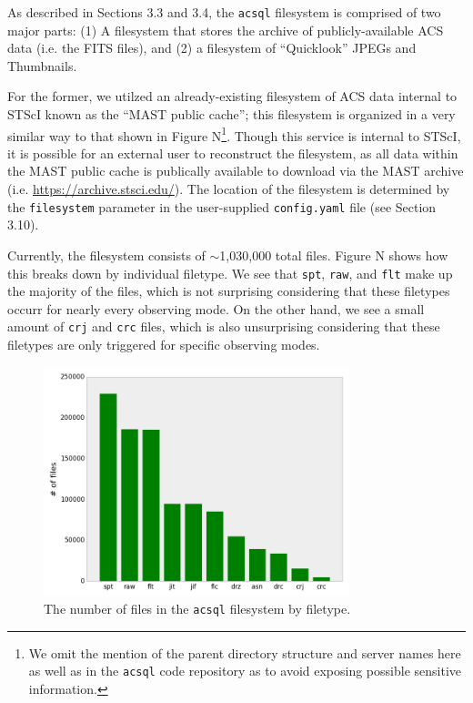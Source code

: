 \documentclass[10pt,journal,compsoc]{IEEEtran}
\begin{document}
As described in Sections 3.3 and 3.4, the \texttt{acsql} filesystem is comprised of two major parts: (1) A filesystem
that stores the archive of publicly-available ACS data (i.e. the FITS files), and (2) a filesystem of ``Quicklook''
JPEGs and Thumbnails.

For the former, we utilzed an already-existing filesystem of ACS data internal to STScI known as the ``MAST public cache'';
this filesystem is organized in a very similar way to that shown in Figure N\footnote{We omit the mention of the parent
directory structure and server names here as well as in the \texttt{acsql} code repository as to avoid exposing possible
sensitive information.}.  Though this service is internal to STScI, it is possible for an external user to reconstruct the
filesystem, as all data within the MAST public cache is publically available to download via the MAST archive (i.e.
\url{https://archive.stsci.edu/}).  The location of the filesystem is determined by the \texttt{filesystem} parameter in
the user-supplied \texttt{config.yaml} file (see Section 3.10).

Currently, the filesystem consists of $\sim$1,030,000 total files. Figure N shows how this breaks down by individual
filetype.  We see that \texttt{spt}, \texttt{raw}, and \texttt{flt} make up the majority of the files, which is not surprising
considering that these filetypes occurr for nearly every observing mode.  On the other hand, we see a small amount of
\texttt{crj} and \texttt{crc} files, which is also unsurprising considering that these filetypes are only triggered for
specific observing modes.

\begin{figure}[!t]
\centering
\includegraphics[width=3.5in]{./figures/num_files_by_filetype.png}
\caption{The number of files in the \texttt{acsql} filesystem by filetype.}
\label{fig1}
\end{figure}
\end{document}
